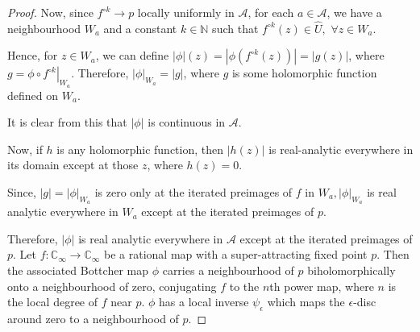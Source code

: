 \begin{proof}
Now, since $f^{\circ k} \rightarrow p$ locally uniformly in $\mathcal{A}$, for each $a \in \mathcal{A}$, we have a neighbourhood $W_{a}$ and a constant $k \in \mathbb{N}$ such that $f^{\circ k}(z) \in \hat{U}, \,\,\forall z \in W_{a}$.

Hence, for $z \in W_{a}$, we can define $|\phi|(z)=\left|\phi\left(f^{\circ k}(z)\right)\right|=|g(z)|$, where $g=\left.\phi \circ f^{\circ k}\right|_{W_{a}}$. Therefore, $|\phi|_{W_{a}}=|g|$, where $g$ is some holomorphic function defined on $W_{a}$.

It is clear from this that $|\phi|$ is continuous in $\mathcal{A}$.

Now, if $h$ is any holomorphic function, then $|h(z)|$ is real-analytic everywhere in its domain except at those $z$, where $h(z)=0$.

Since, $|g|=|\phi|_{W_{a}}$ is zero only at the iterated preimages of $f$ in $W_{a},|\phi|_{W_{a}}$ is real analytic everywhere in $W_{a}$ except at the iterated preimages of $p$.

Therefore, $|\phi|$ is real analytic everywhere in $\mathcal{A}$ except at the iterated preimages of $p$. Let $f: \mathbb{C}_{\infty} \rightarrow \mathbb{C}_{\infty}$ be a rational map with a super-attracting fixed point $p$. Then the associated Bottcher map $\phi$ carries a neighbourhood of $p$ biholomorphically onto a neighbourhood of zero, conjugating $f$ to the $n$th power map, where $n$ is the local degree of $f$ near $p$. $\phi$ has a local inverse $\psi_{\epsilon}$ which maps the $\epsilon$-disc around zero to a neighbourhood of $p$.
\end{proof}

